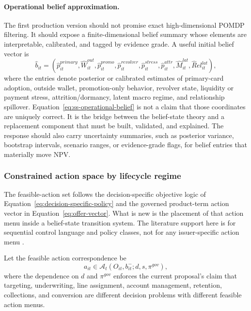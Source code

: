\documentclass[11pt]{article}
\newcommand{\1}{\mathbf{1}}
\begin{document}
\paragraph{Operational belief approximation.}
The first production version should not promise exact high-dimensional POMDP
filtering. It should expose a finite-dimensional belief summary whose elements
are interpretable, calibrated, and tagged by evidence grade. A useful initial
belief vector is
\begin{equation}
  \widehat b_{it}
  =
  (\widehat p^{primary}_{it},\widehat W^{out}_{it},
   \widehat p^{promo}_{it},\widehat p^{revolver}_{it},
   \widehat p^{stress}_{it},\widehat p^{attr}_{it},
   \widehat M^{lat}_{it},\widehat Rel^{lat}_{it}),
  \label{eq:ss-operational-belief}
\end{equation}
where the entries denote posterior or calibrated estimates of primary-card
adoption, outside wallet, promotion-only behavior, revolver state, liquidity or
payment stress, attrition/dormancy, latent macro regime, and relationship
spillover. Equation~\eqref{eq:ss-operational-belief} is not a claim that those
coordinates are uniquely correct. It is the bridge between the belief-state
theory and a replacement component that must be built, validated, and explained.
The response should also carry uncertainty summaries, such as posterior
variance, bootstrap intervals, scenario ranges, or evidence-grade flags, for
belief entries that materially move NPV.

\subsubsection{Constrained action space by lifecycle regime}
\label{subsec:state-space-action-space}

The feasible-action set follows the decision-specific objective logic of
Equation~\eqref{eq:decision-specific-policy} and the governed product-term
action vector in Equation~\eqref{eq:offer-vector}. What is new is the placement
of that action menu inside a belief-state transition system. The literature
support here is for sequential control language and policy classes, not for
any issuer-specific action menu
\citep{puterman1994mdp,murphy2003dynamic,trench2003bankone}.

Let the feasible action correspondence be
\begin{equation}
  a_{it}\in\mathcal{A}_{t}(O_{it},b_{it}^{-};d,s,\pi^{gov}),
  \label{eq:ss-feasible-actions}
\end{equation}
where the dependence on $d$ and $\pi^{gov}$ enforces the current proposal's
claim that targeting, underwriting, line assignment, account management,
retention, collections, and conversion are different decision problems with
different feasible action menus.
\end{document}
